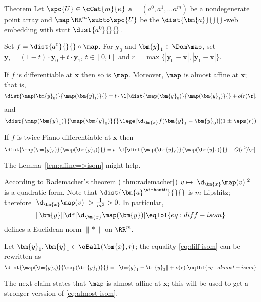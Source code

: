 \begin{thm}{Theorem}\label{thm:loc-lip-inverse+}
Let $\spc{U}\in\cCat{m}{\kappa}$ 
$\bm{a}=(a^0,a^1,\dots a^m)$ be a nondegenerate point array
and $\map\:\RR^m\subto\spc{U}$ be the $\dist{\bm{a}}{}{}$-web embedding 
with stutt $\dist{a^0}{}{}$.

Set $f=\dist{a^0}{}{}\circ\map$.
For $\bm{y}_0$ and $\bm{y}_1\in\Dom\map$,
set $\bm{y}_t=(1-t)\cdot \bm{y}_0+t\cdot \bm{y}_1 $, $t\in [0,1]$
and $r=\max\{|\bm{y}_0-\bm{x}|,|\bm{y}_1-\bm{x}|\}$.

\begin{subthm}{}
If $f$ is differentiable at $\bm{x}$ then so is $\map$.
Moreover, $\map$ is almost affine at $\bm{x}$;
that is,
\[\dist{\map(\bm{y}_0)}{\map(\bm{y}_t)}{}
=
t
\cdot
\l[
\dist{\map(\bm{y}_0)}{\map(\bm{y}_1)}{}
+
o(r)
\r].
\]
and 
\[
\dist{\map(\bm{y}_1)}{\map(\bm{y}_0)}{}
\lege
|\d_{\bm{x}}f(\bm{y}_1-\bm{y}_0)|(1\pm\eps(r))%
\]

\end{subthm}

\begin{subthm}{}
If $f$ is twice Piano-differentiable at $\bm{x}$ 
then 
\[\dist{\map(\bm{y}_0)}{\map(\bm{y}_t)}{}
=
t
\cdot
\l[
\dist{\map(\bm{y}_0)}{\map(\bm{y}_1)}{}
+
O(r^2)
\r].
\]
\end{subthm}

\end{thm}

The Lemma~\ref{lem:affine=>isom} might help.











According to Rademacher's theorem (\ref{thm:rademacher}) 
$v\mapsto |\d_{\bm{x}}\map(v)|^2$
is a quadratic form.
Note that $\dist{\bm{a}^{\without 0}}{}{}$ is $m$-Lipshitz;
therefore $|\d_{\bm{x}}\map(v)|>\tfrac1{m^2}>0$.
In particular, 
\[
\|\bm{y}\|
\df
|\d_{\bm{x}}\map(\bm{y})|
\eqlbl{eq:diff-isom}
\]
defines a Euclidean norm $\|{*}\|$ on $\RR^m$.

Let $\bm{y}_0,\bm{y}_1\in\oBall(\bm{x},r)$;
the equality \ref{eq:diff-isom} can be rewritten as
\[\dist{\map(\bm{y}_0)}{\map(\bm{y}_1)}{}=\|\bm{y}_1-\bm{y}_2\|+o(r).
\eqlbl{eq:almost-isom}\]

The next claim states that $\map$ is almost affine at $\bm{x}$;
this will be used to get a stronger verssion of \ref{eq:almost-isom}.

